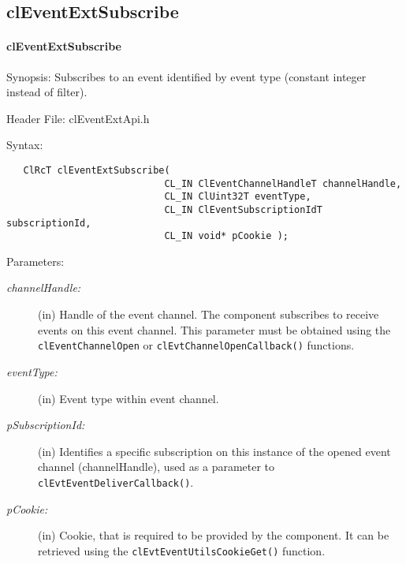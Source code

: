 \begin{flushleft}
\subsection{clEventExtSubscribe}
\hypertarget{pageem201}{}\paragraph{cl\-Event\-Ext\-Subscribe}\label{pageem201}
\begin{Desc}
\item[Synopsis:]Subscribes to an event identified by event type (constant integer instead of filter).\end{Desc}
\begin{Desc}
\item[Header File:]clEventExtApi.h\end{Desc}
\begin{Desc}
\item[Syntax:]

\footnotesize\begin{verbatim}   ClRcT clEventExtSubscribe(
              				CL_IN ClEventChannelHandleT channelHandle,
              				CL_IN ClUint32T eventType,
              				CL_IN ClEventSubscriptionIdT subscriptionId,
              				CL_IN void* pCookie );
\end{verbatim}
\normalsize
\end{Desc}
\begin{Desc}
\item[Parameters:]
\begin{description}
\item[{\em channel\-Handle:}](in) Handle of the event channel. The component subscribes to receive events on this event channel. This parameter must be
obtained using the {\tt{cl\-Event\-Channel\-Open}} or {\tt{cl\-Evt\-Channel\-Open\-Callback()}} functions.

\item[{\em event\-Type:}](in) Event type within event channel.

\item[{\em p\-Subscription\-Id:}](in) Identifies a specific subscription on this instance of the opened event channel (channel\-Handle), used as
a parameter to {\tt{cl\-Evt\-Event\-Deliver\-Callback()}}.

\item[{\em p\-Cookie:}](in) Cookie, that is required to be provided by the component. It can be retrieved using the 
{\tt{cl\-Evt\-Event\-Utils\-Cookie\-Get()}} function.


\end{description}
\end{Desc}
\end{flushleft}
